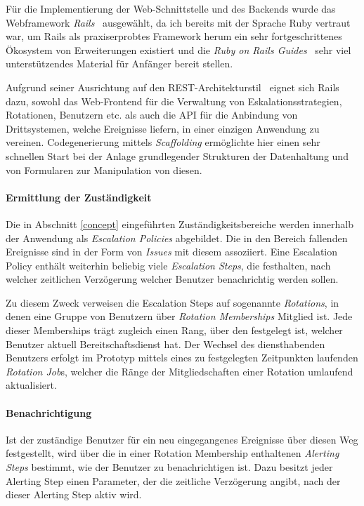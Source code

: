 \documentclass[11pt,utf8,notoc,bibnum,german,final]{zihpub}
\begin{document}
Für die Implementierung der Web-Schnittstelle und des Backends wurde das
Webframework \emph{Rails}~\cite{rails} ausgewählt, da ich bereits mit der Sprache
Ruby vertraut war, um Rails als praxiserprobtes Framework herum ein sehr
fortgeschrittenes Ökosystem von Erweiterungen existiert und die \emph{Ruby on Rails
Guides}~\cite{rails-guides} sehr viel unterstützendes Material für Anfänger
bereit stellen.

Aufgrund seiner Ausrichtung auf den REST-Architekturstil~\cite{fielding-rest}
eignet sich Rails dazu, sowohl das Web-Frontend für die Verwaltung von
Eskalationsstrategien, Rotationen, Benutzern etc. als auch die API für die
Anbindung von Drittsystemen, welche Ereignisse liefern, in einer einzigen
Anwendung zu vereinen. Codegenerierung mittels \emph{Scaffolding} ermöglichte
hier einen sehr schnellen Start bei der Anlage grundlegender Strukturen der
Datenhaltung und von Formularen zur Manipulation von diesen.

\paragraph{Ermittlung der Zuständigkeit}

Die in Abschnitt \ref{concept} eingeführten Zuständigkeitsbereiche werden
innerhalb der Anwendung als \emph{Escalation Policies} abgebildet. Die in den
Bereich fallenden Ereignisse sind in der Form von \emph{Issues} mit diesem
assoziiert. Eine Escalation Policy enthält weiterhin beliebig viele
\emph{Escalation Steps}, die festhalten, nach welcher zeitlichen Verzögerung
welcher Benutzer benachrichtig werden sollen.

Zu diesem Zweck verweisen die Escalation Steps auf sogenannte \emph{Rotations},
in denen eine Gruppe von Benutzern über \emph{Rotation Memberships} Mitglied
ist. Jede dieser Memberships trägt zugleich einen Rang, über den festgelegt
ist, welcher Benutzer aktuell Bereitschaftsdienst hat. Der Wechsel des
diensthabenden Benutzers erfolgt im Prototyp mittels eines zu festgelegten
Zeitpunkten laufenden \emph{Rotation Job}s, welcher die Ränge der
Mitgliedschaften einer Rotation umlaufend aktualisiert.

\paragraph{Benachrichtigung}

Ist der zuständige Benutzer für ein neu eingegangenes Ereignisse über diesen
Weg festgestellt, wird über die in einer Rotation Membership enthaltenen
\emph{Alerting Steps} bestimmt, wie der Benutzer zu benachrichtigen ist. Dazu
besitzt jeder Alerting Step einen Parameter, der die zeitliche Verzögerung
angibt, nach der dieser Alerting Step aktiv wird.
\end{document}
